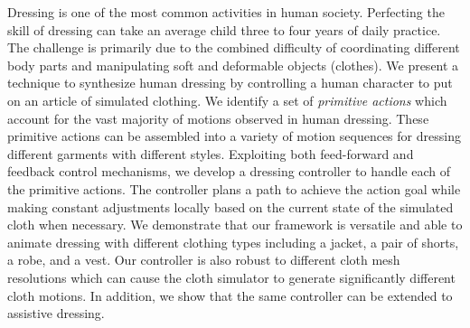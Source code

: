 Dressing is one of the most common activities in human society. Perfecting
the skill of dressing can take an average child three to four years of
daily practice. The challenge is primarily due to the combined difficulty
of coordinating different body parts and manipulating soft and deformable
objects (clothes). We present a technique to synthesize human dressing by
controlling a human character to put on an article of simulated clothing.
We identify a set of \emph{primitive actions} which account for the vast
majority of motions observed in human dressing. These primitive actions
can be assembled into a variety of motion sequences for dressing different
garments with different styles. Exploiting both feed-forward and feedback
control mechanisms, we develop a dressing controller to handle each of the
primitive actions. The controller plans a path to achieve the action goal
while making constant adjustments locally based on the current state of
the simulated cloth when necessary. We demonstrate that our framework is
versatile and able to animate dressing with different clothing types
including a jacket, a pair of shorts, a robe, and a vest. Our controller
is also robust to different cloth mesh resolutions which can cause the
cloth simulator to generate significantly different cloth motions. In
addition, we show that the same controller can be extended to assistive
dressing.

